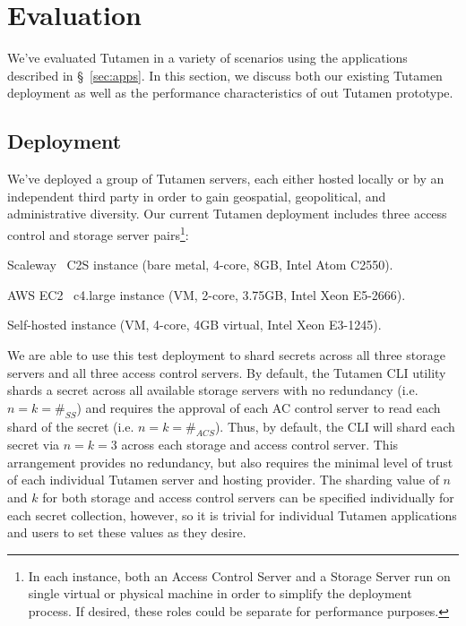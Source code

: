 \section{Evaluation}
\label{sec:eval}

We've evaluated Tutamen in a variety of scenarios using the
applications described in \S~\ref{sec:apps}. In this section, we
discuss both our existing Tutamen deployment as well as the
performance characteristics of out Tutamen prototype.

\subsection{Deployment}
\label{sec:eval:deployment}

We've deployed a group of Tutamen servers, each either hosted locally
or by an independent third party in order to gain geospatial,
geopolitical, and administrative diversity. Our current Tutamen
deployment includes three access control and storage server
pairs\footnote{In each instance, both an Access Control Server and a
  Storage Server run on single virtual or physical machine in order to
  simplify the deployment process. If desired, these roles could be
  separate for performance purposes.}:

\begin{packed_desc}
\item[Paris, France:] Scaleway~\cite{scaleway} C2S instance (bare
  metal, 4-core, 8GB, Intel Atom C2550).
\item[North Virginia:] AWS EC2~\cite{amazon-ec2} c4.large instance
  (VM, 2-core, 3.75GB, Intel Xeon E5-2666).
\item[Boulder, CO:] Self-hosted instance (VM, 4-core, 4GB virtual,
  Intel Xeon E3-1245).
\end{packed_desc}

We are able to use this test deployment to shard secrets across all
three storage servers and all three access control servers. By
default, the Tutamen CLI utility shards a secret across all available
storage servers with no redundancy (i.e. $n=k=\#_{SS}$) and requires
the approval of each AC control server to read each shard of the
secret (i.e. $n=k=\#_{ACS}$). Thus, by default, the CLI will shard
each secret via $n=k=3$ across each storage and access control
server. This arrangement provides no redundancy, but also requires the
minimal level of trust of each individual Tutamen server and hosting
provider. The sharding value of $n$ and $k$ for both storage and
access control servers can be specified individually for each secret
collection, however, so it is trivial for individual Tutamen
applications and users to set these values as they desire.

